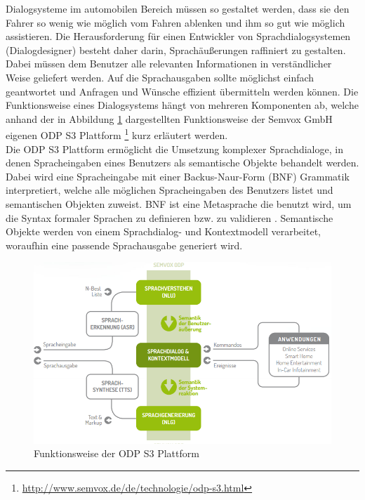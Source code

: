 \documentclass[12pt,a4paper]{scrartcl}
\begin{document}
Dialogsysteme im automobilen Bereich müssen so gestaltet werden, dass sie den Fahrer so wenig wie möglich vom Fahren ablenken und ihm so gut wie möglich assistieren. Die Herausforderung für einen Entwickler von Sprachdialogsystemen (Dialogdesigner) besteht daher darin, Sprachäußerungen raffiniert zu gestalten. Dabei müssen dem Benutzer alle relevanten Informationen in verständlicher Weise geliefert werden. Auf die Sprachausgaben sollte möglichst einfach geantwortet und Anfragen und Wünsche effizient übermitteln werden können. Die Funktionsweise eines Dialogsystems hängt von mehreren Komponenten ab, welche anhand der in Abbildung \ref{odps3} dargestellten Funktionsweise der Semvox GmbH eigenen ODP S3 Plattform \footnote{\label{foot:odps3}\url{http://www.semvox.de/de/technologie/odp-s3.html}} kurz erläutert werden. \\
Die ODP S3 Plattform ermöglicht die Umsetzung komplexer Sprachdialoge, in denen Spracheingaben eines Benutzers als semantische Objekte behandelt werden. Dabei wird eine Spracheingabe mit einer Backus-Naur-Form (BNF) Grammatik interpretiert, welche alle möglichen Spracheingaben des Benutzers listet und semantischen Objekten zuweist. BNF ist eine Metasprache die benutzt wird, um die Syntax formaler Sprachen zu definieren bzw. zu validieren \cite{BNFref}. Semantische Objekte werden von einem Sprachdialog- und Kontextmodell verarbeitet, woraufhin eine passende Sprachausgabe generiert wird. 
\begin{figure}[H]
\begin{center}
\includegraphics[width=14cm]{odps3.png}
\caption{Funktionsweise der ODP S3 Plattform}
\label{odps3}
\end{center}
\end{figure}
\end{document}
